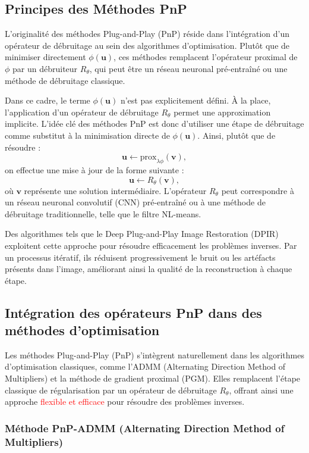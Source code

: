 \documentclass[a4paper, 12pt]{report} %
\begin{document}
\subsection{Principes des Méthodes PnP}

L’originalité des méthodes Plug-and-Play (PnP) réside dans l’intégration d’un opérateur de débruitage au sein des algorithmes d’optimisation. Plutôt que de minimiser directement \( \phi(\mathbf{u}) \), ces méthodes remplacent l’opérateur proximal de \( \phi \) par un débruiteur \( R_\theta \), qui peut être un réseau neuronal pré-entraîné ou une méthode de débruitage classique.

Dans ce cadre, le terme \( \phi(\mathbf{u}) \) n'est pas explicitement défini. À la place, l'application d'un opérateur de débruitage \( R_\theta \) permet une approximation implicite. L’idée clé des méthodes PnP est donc d’utiliser une étape de débruitage comme substitut à la minimisation directe de \( \phi(\mathbf{u}) \). Ainsi, plutôt que de résoudre :
\[
\mathbf{u} \leftarrow \text{prox}_{\lambda \phi}(\mathbf{v}),
\]
on effectue une mise à jour de la forme suivante :
\[
\mathbf{u} \leftarrow R_\theta(\mathbf{v}), 
\]
où \( \mathbf{v} \) représente une solution intermédiaire. L’opérateur \( R_\theta \) peut correspondre à un réseau neuronal convolutif (CNN) pré-entraîné ou à une méthode de débruitage traditionnelle, telle que le filtre NL-means.

Des algorithmes tels que le Deep Plug-and-Play Image Restoration (DPIR) exploitent cette approche pour résoudre efficacement les problèmes inverses. Par un processus itératif, ils réduisent progressivement le bruit ou les artéfacts présents dans l’image, améliorant ainsi la qualité de la reconstruction à chaque étape.

\subsection{Intégration des opérateurs PnP dans des méthodes d’optimisation}

Les méthodes Plug-and-Play (PnP) s’intègrent naturellement dans les algorithmes d’optimisation classiques, comme l’ADMM (Alternating Direction Method of Multipliers) et la méthode de gradient proximal (PGM). Elles remplacent l’étape classique de régularisation par un opérateur de débruitage \( R_\theta \), offrant ainsi une approche \textcolor{red}{flexible et efficace} pour résoudre des problèmes inverses.

\subsubsection{Méthode PnP-ADMM (Alternating Direction Method of Multipliers)}
\end{document}

